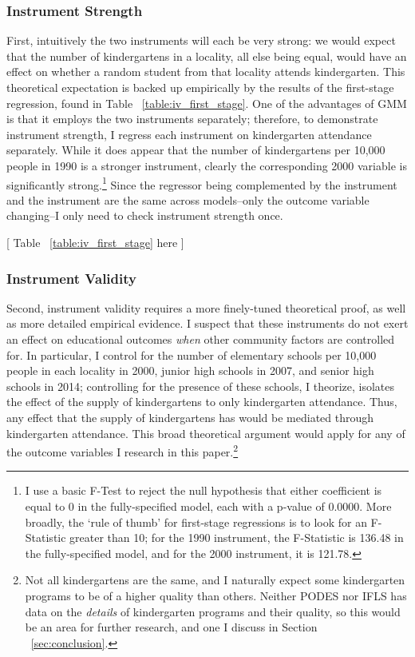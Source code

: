 	\subsubsection{Instrument Strength} 
First, intuitively the two instruments will each be very strong: we would expect that the number of kindergartens in a locality, all else being equal, would have an effect on whether a random student from that locality attends kindergarten. This theoretical expectation is backed up empirically by the results of the first-stage regression, found in Table ~\ref{table:iv_first_stage}. One of the advantages of GMM is that it employs the two instruments separately; therefore, to demonstrate instrument strength, I regress each instrument on kindergarten attendance separately. While it does appear that the number of kindergartens per 10,000 people in 1990 is a stronger instrument, clearly the corresponding 2000 variable is significantly strong.\footnote{I use a basic F-Test to reject the null hypothesis that either coefficient is equal to 0 in the fully-specified model, each with a p-value of 0.0000. More broadly, the `rule of thumb' for first-stage regressions is to look for an F-Statistic greater than 10; for the 1990 instrument, the F-Statistic is 136.48 in the fully-specified model, and for the 2000 instrument, it is 121.78.} Since the regressor being complemented by the instrument and the instrument are the same across models--only the outcome variable changing--I only need to check instrument strength once.
\begin{center}
	[ Table ~\ref{table:iv_first_stage} here ]
\end{center}
	\subsubsection{Instrument Validity}
Second, instrument validity requires a more finely-tuned theoretical proof, as well as more detailed empirical evidence. I suspect that these instruments do not exert an effect on educational outcomes \textit{when} other community factors are controlled for. In particular, I control for the number of elementary schools per 10,000 people in each locality in 2000, junior high schools in 2007, and senior high schools in 2014; controlling for the presence of these schools, I theorize, isolates the effect of the supply of kindergartens to only kindergarten attendance. Thus, any effect that the supply of kindergartens has would be mediated through kindergarten attendance. This broad theoretical argument would apply for any of the outcome variables I research in this paper.\footnote{Not all kindergartens are the same, and I naturally expect some kindergarten programs to be of a higher quality than others. Neither PODES nor IFLS has data on the \textit{details} of kindergarten programs and their quality, so this would be an area for further research, and one I discuss in Section ~\ref{sec:conclusion}.} 

